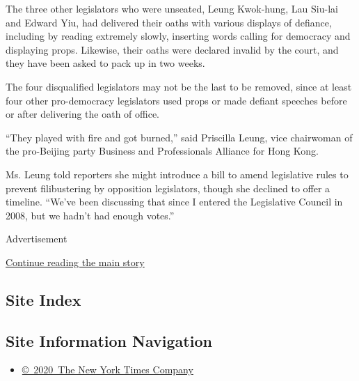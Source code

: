 The three other legislators who were unseated, Leung Kwok-hung, Lau
Siu-lai and Edward Yiu, had delivered their oaths with various displays
of defiance, including by reading extremely slowly, inserting words
calling for democracy and displaying props. Likewise, their oaths were
declared invalid by the court, and they have been asked to pack up in
two weeks.

The four disqualified legislators may not be the last to be removed,
since at least four other pro-democracy legislators used props or made
defiant speeches before or after delivering the oath of office.

``They played with fire and got burned,'' said Priscilla Leung, vice
chairwoman of the pro-Beijing party Business and Professionals Alliance
for Hong Kong.

Ms. Leung told reporters she might introduce a bill to amend legislative
rules to prevent filibustering by opposition legislators, though she
declined to offer a timeline. ``We've been discussing that since I
entered the Legislative Council in 2008, but we hadn't had enough
votes.''

Advertisement

\protect\hyperlink{after-bottom}{Continue reading the main story}

\hypertarget{site-index}{%
\subsection{Site Index}\label{site-index}}

\hypertarget{site-information-navigation}{%
\subsection{Site Information
Navigation}\label{site-information-navigation}}

\begin{itemize}
\tightlist
\item
  \href{https://help.nytimes3xbfgragh.onion/hc/en-us/articles/115014792127-Copyright-notice}{©~2020~The
  New York Times Company}
\end{itemize}

